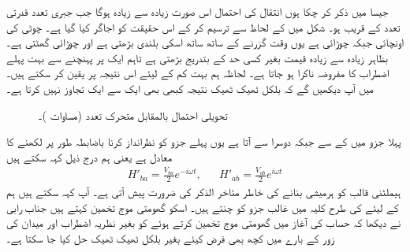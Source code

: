 جیسا میں ذکر کر چکا ہوں انتقال کی احتمال اس صورت زیادہ سے زیادہ ہوگا جب جبری تعدد قدرتی تعدد  کے قریب ہو۔ شکل   میں  کے لحاظ سے  ترسیم کر کے اس حقیقت کو اجاگر کیا گیا ہے۔ چوٹی کی اونچائی  جبکہ چوڑائی  ہے یوں وقت گزرنے کے ساتھ ساتھ اسکی بلندی بڑھتی ہے اور چوڑائی گھٹتی ہے۔ بظاہر زیادہ سے زیادہ قیمت بغیر کسی حد کے بتدریج بڑھتی ہے تاہم ایک پر پہنچنے سے بہت پہلے اضطراب کا مفروضہ ناکرا ہو جاتا ہے۔ لحاظہ ہم بہت کم  کے لیئے اس نتیجہ پر یقین کر سکتے ہیں۔  میں آپ دیکھیں گے کہ بلکل ٹھیک ٹھیک نتیجہ کبھی بھی ایک سے ایک تجاوز نہیں کرتا ہے۔
\begin{figure}
\centering
{}
\caption{تحویلی احتمال بالمقابل   متحرک  تعدد  (مساوات )۔}
\label{شکل_تابع_وقت_احتمال_جبری_تعدد}
\end{figure}


پہلا جزو  میں  کے  سے جبکہ دوسرا  سے آتا ہے یوں پہلے جزو کو  نظرانداز کرنا باضابطہ طور پر  لکھنے کا معادل ہے یعنی ہم درج ذیل کہہ سکتے ہیں
\begin{align}
	H'_{ba}=\frac{V_{ba}}{2}e^{-i\omega t},&&H'_{ab}=\frac{V_{ab}}{2}e^{i\omega t}
\end{align}
ہیملٹنی قالب کو ہرمیشی بنانے کی خاطر مئاخر الذکر کی ضرورت پیش آتی ہے۔ آپ کہہ سکتے ہیں ہم  کے لیئے  کی طرح کلیہ میں غالب جزو کو چنتے ہیں۔ اسکو گھومتی موج تخمین کہتے ہیں جناب رابی نے دیکھا کہ حساب کی آغاز میں گھومتی موج تخمین کرتے ہوئے  کو بغیر نظریہ اضطراب اور میدان کی زور کے بارے میں کچھ بھی فرض کیئے بغیر بلکل ٹھیک ٹھیک حل کیا جا سکتا ہے۔

